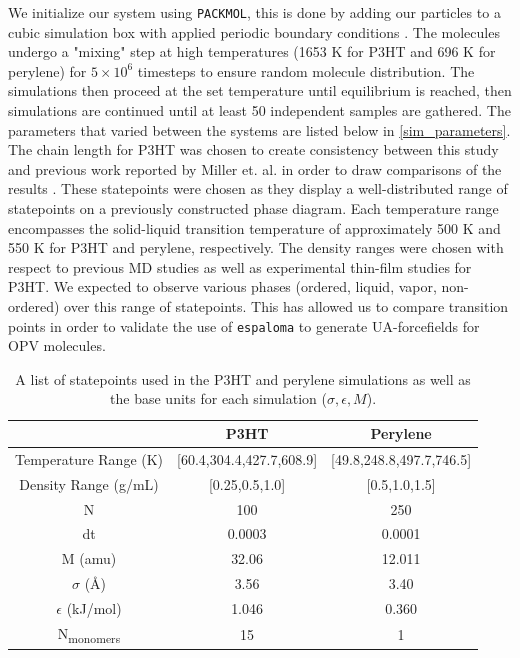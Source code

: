 \par We initialize our system using \texttt{PACKMOL}, this is done by adding our particles to a cubic simulation box with applied periodic boundary conditions \citep{martinez_p_2009}. The molecules undergo a "mixing" step at high temperatures (1653 K for P3HT and 696 K for perylene) for $5 \times 10^6$ timesteps to ensure random molecule distribution. The simulations then proceed at the set temperature until equilibrium is reached, then simulations are continued until at least 50 independent samples are gathered. The parameters that varied between the systems are listed below in \autoref{sim_parameters}. The chain length for P3HT was chosen to create consistency between this study and previous work reported by Miller et. al. in order to draw comparisons of the results \citep{miller_optimization_2018}. These statepoints were chosen as they display a well-distributed range of statepoints on a previously constructed phase diagram. Each temperature range encompasses the solid-liquid transition temperature of approximately 500 K and 550 K for P3HT and perylene, respectively. The density ranges were chosen with respect to previous MD studies as well as experimental thin-film studies for P3HT. We expected to observe various phases (ordered, liquid, vapor, non-ordered) over this range of statepoints. This has allowed us to compare transition points in order to validate the use of \texttt{espaloma} to generate UA-forcefields for OPV molecules.
\begin{table}
  \centering
  \begin{tabular}{c|c|c}
      & \textbf{P3HT} & \textbf{Perylene} \\
    \hline
    Temperature Range (K) & [60.4,304.4,427.7,608.9]& [49.8,248.8,497.7,746.5]\\
    \hline
    Density Range (g/mL) & [0.25,0.5,1.0] & [0.5,1.0,1.5]\\
    \hline
    N & 100 & 250 \\
    \hline
    dt & 0.0003 & 0.0001 \\
    \hline
    M (amu) & 32.06 & 12.011 \\
    \hline
    \(\sigma\) (\AA)& 3.56 & 3.40 \\
    \hline
    \(\epsilon\) (kJ/mol)& 1.046 & 0.360\\
    \hline
    N\textsubscript{monomers}& 15 & 1 \\
  \end{tabular}
  \caption{A list of statepoints used in the P3HT and perylene simulations as well as the base units for each simulation (\begin{math}\sigma , \epsilon , M\end{math}).}
  \label{sim_parameters}
\end{table}

